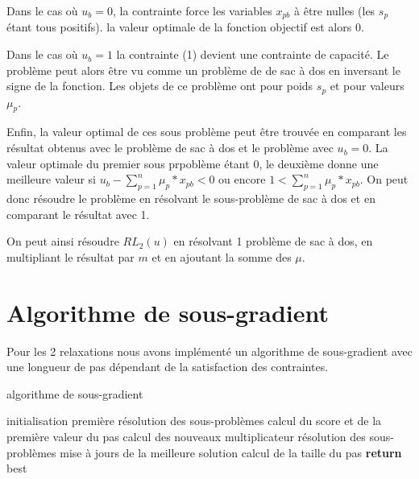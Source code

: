 \documentclass{article}
\begin{document}
Dans le cas où $u_b = 0$, la contrainte force les variables $x_{pb}$ à être nulles (les $s_p$ étant tous positifs).
la valeur optimale de la fonction objectif est alors $0$. \newline

Dans le cas où $u_b = 1$ la contrainte (1) devient une contrainte de capacité.
Le problème peut alors être vu comme un problème de de sac à dos en inversant le signe de la fonction.
Les objets de ce problème ont pour poids $s_p$ et pour valeurs $\mu_p$. \newline

Enfin, la valeur optimal de ces sous problème peut être trouvée en comparant les résultat obtenus avec le problème de sac à dos et le problème avec $u_b = 0$.
La valeur optimale du premier sous prpoblème étant $0$, le deuxième donne une meilleure valeur si $u_b - \sum_{p=1}^n \mu_p*x_{pb} < 0$ ou encore $1 < \sum_{p=1}^n \mu_p*x_{pb}$.
On peut donc résoudre le problème en résolvant le sous-problème de sac à dos et en comparant le résultat avec 1.\newline

On peut ainsi résoudre $RL_2(u)$ en résolvant 1 problème de sac à dos, en multipliant le résultat par $m$ et en ajoutant la somme des $\mu$. 

\section{Algorithme de sous-gradient}

Pour les 2 relaxations nous avons implémenté un algorithme de sous-gradient avec une longueur de pas dépendant de la satisfaction des contraintes.

\begin{algorithm}
\caption{algorithme de sous-gradient}
\begin{algorithmic}[1]
	\State initialisation
	\State première résolution des sous-problèmes
	\State calcul du score et de la première valeur du pas
		\State calcul des nouveaux multiplicateur
		\State résolution des sous-problèmes
		\State mise à jours de la meilleure solution
		\State calcul de la taille du pas
	\EndWhile
	\State \textbf{return} best
\EndFunction
\end{algorithmic}
\end{algorithm}
\end{document}
